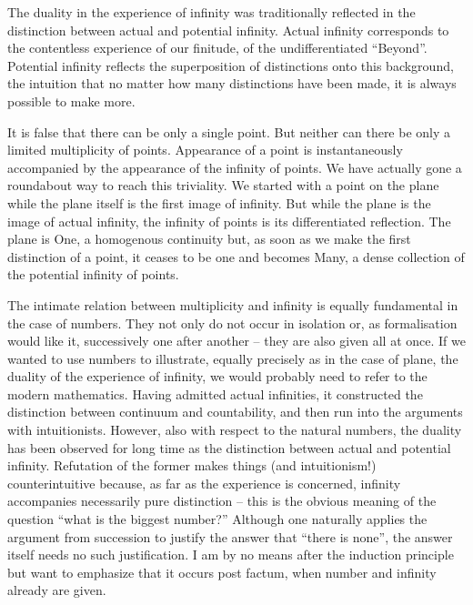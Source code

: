 The duality in the experience of infinity was traditionally reflected in the 
distinction between actual and potential infinity. Actual infinity corresponds to
the contentless experience of our finitude, of the undifferentiated ``Beyond''.
Potential infinity reflects the superposition of distinctions onto this background, the intuition that no matter how many distinctions have been made, it is
always possible to make more.

It is false that there can be only a single point. But neither can there be only a limited multiplicity of points. Appearance of a point is instantaneously accompanied by the appearance of the infinity of points. We have actually gone a roundabout way to reach this triviality. We started with a point on the plane while the plane itself is the first image of infinity. But while the plane is
the image of actual infinity, the infinity of points is its differentiated reflection. The plane is One, a homogenous continuity but, as soon as we make the first distinction of a point, it ceases to be one and becomes Many, a dense 
collection of the potential infinity of points.

The intimate relation between multiplicity and infinity is equally fundamental in the case of numbers. They not only do not occur in isolation or, as formalisation would like it, successively one after another -- they are also given all
at once. If we wanted to use numbers to illustrate, equally precisely as in the
case of plane, the duality of the experience of infinity, we would probably
need to refer to the modern mathematics. Having admitted actual 
infinities, it constructed the distinction between continuum and countability,
and then run into the arguments with intuitionists.
However, also with respect to the natural numbers, the duality has been 
observed for long time as
the distinction between actual and potential infinity.
Refutation of the former makes things (and intuitionism!) counterintuitive
because, as far as the experience is concerned,
infinity accompanies necessarily pure distinction -- this is the obvious meaning of the question ``what is the biggest number?'' Although one naturally applies the argument from succession to justify the answer that ``there is none'', the answer itself needs no such justification. I am by no means after the induction principle but want to emphasize that it occurs post factum, when number and infinity already are given. 

